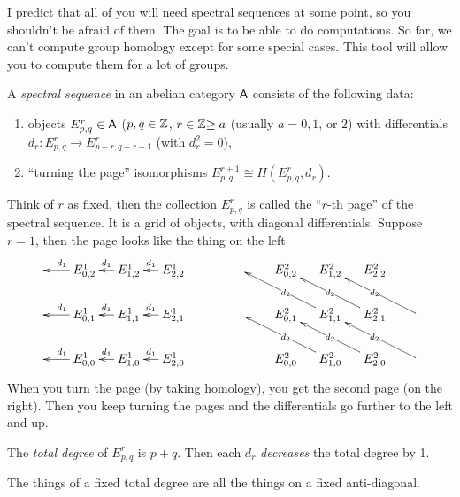 
I predict that all of you will need spectral sequences at some point, so you shouldn't be afraid of them. The goal is to be able to do computations. So far, we can't compute group homology except for some special cases. This tool will allow you to compute them for a lot of groups.
\begin{definition}
 A \emph{spectral sequence} in an abelian category $\text{\sf A}$ consists of the following data:
 \begin{enumerate}
  \item objects $E_{p,q}^r\in \text{\sf A}$ ($p,q\in \mathbb{Z}$, $r\in \mathbb{Z}{\ge a}$ (usually $a=0,1$, or $2$) with differentials $d_r\colon E_{p,q}^r\to E_{p-r,q+r-1}^r$ (with $d_r^2=0$),
  \item ``turning the page'' isomorphisms $E_{p,q}^{r+1}\cong H(E_{p,q}^r,d_r)$.
 \end{enumerate}
\end{definition}
Think of $r$ as fixed, then the collection $E_{p,q}^r$ is called the ``$r$-th page'' of the spectral sequence. It is a grid of objects, with diagonal differentials. Suppose $r=1$, then the page looks like the thing on the left
\[\xymatrix @!0 @+1pc{
 & E^1_{0,2}\ar[l]_{d_1} & E^1_{1,2}\ar[l]_{d_1} & E^1_{2,2}\ar[l]_{d_1}\\
 & E^1_{0,1}\ar[l]_{d_1} & E^1_{1,1}\ar[l]_{d_1} & E^1_{2,1}\ar[l]_{d_1}\\
 & E^1_{0,0}\ar[l]_{d_1} & E^1_{1,0}\ar[l]_{d_1} & E^1_{2,0}\ar[l]_{d_1}\\
}\qquad\qquad
\xymatrix @!0 @+1pc{
 & E^2_{0,2} & E^2_{1,2} & E^2_{2,2}\\
 & E^2_{0,1} & E^2_{1,1}\ar[ull]|{d_2} & E^2_{2,1} \ar[ull]|{d_2} & \ar[ull]|{d_2}\\
 & E^2_{0,0} & E^2_{1,0}\ar[ull]|{d_2} & E^2_{2,0} \ar[ull]|{d_2} & \ar[ull]|{d_2}\\
}\]
When you turn the page (by taking homology), you get the second page (on the right). Then you keep turning the pages and the differentials go further to the left and up.
\begin{definition}
 The \emph{total degree} of $E^r_{p,q}$ is $p+q$. Then each $d_r$ \emph{decreases} the total degree by 1.
\end{definition}
The things of a fixed total degree are all the things on a fixed anti-diagonal.

